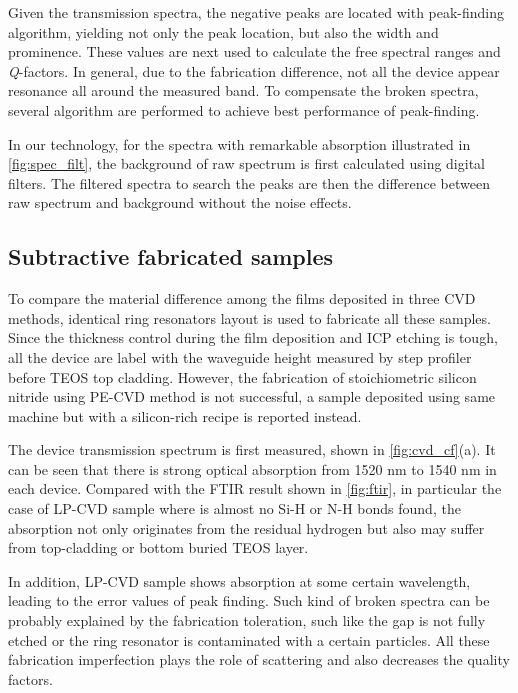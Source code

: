 Given the transmission spectra, the negative peaks are located with peak-finding algorithm, yielding not only the peak location, but also the width and prominence. These values are next used to calculate the free spectral ranges and \textit{Q}-factors. In general, due to the fabrication difference, not all the device appear resonance all around the measured band. To compensate the broken spectra, several algorithm are performed to achieve best performance of peak-finding. 

\begin{figure}
	\centering
	
	\mycaption{}{}
	\label{fig:spec_filt}
\end{figure}

In our technology, for the spectra with remarkable absorption illustrated in \autoref{fig:spec_filt}, the background of raw spectrum is first calculated using digital filters. The filtered spectra to search the peaks are then the difference between raw spectrum and background without the noise effects.


\subsection{Subtractive fabricated samples}

To compare the material difference among the films deposited in three CVD methods, identical ring resonators layout is used to fabricate all these samples. %
Since the thickness control during the film deposition and ICP etching is tough, all the device are label with the waveguide height measured by step profiler before TEOS top cladding. However, the fabrication of stoichiometric silicon nitride using PE-CVD method is not successful, a sample deposited using same machine but with a silicon-rich recipe is reported instead. 

The device transmission spectrum is first measured, shown in \autoref{fig:cvd_cf}(a). It can be seen that there is strong optical absorption from 1520 nm to 1540 nm in each device. Compared with the FTIR result shown in \autoref{fig:ftir}, in particular the case of LP-CVD sample where is almost no Si-H or N-H bonds found, the absorption not only originates from the residual hydrogen but also may suffer from top-cladding or bottom buried TEOS layer. 

In addition, LP-CVD sample shows absorption at some certain wavelength, leading to the error values of peak finding. Such kind of broken spectra can be probably explained by the fabrication toleration, such like the gap is not fully etched or the ring resonator is contaminated with a certain particles. All these fabrication imperfection plays the role of scattering and also decreases the quality factors.

